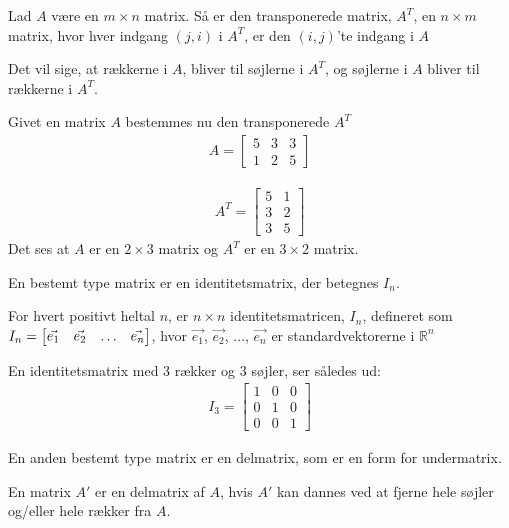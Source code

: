 \begin{defn}
Lad $A$ være en $m \times n$ matrix. Så er den transponerede matrix, $A^T$, en $n \times m$ matrix, hvor hver indgang $(j,i)$ i $A^T$, er den $(i,j)$'te indgang i $A$
\label{def:(transmatrix)} 
\end{defn}
Det vil sige, at rækkerne i $A$, bliver til søjlerne i $A^T$, og søjlerne i $A$ bliver til rækkerne i $A^T$.

\begin{eks}
Givet en matrix $A$ bestemmes nu den transponerede $A^T$
\begin{align*}
A = \begin{bmatrix}
	5 & 3 & 3 \\
	1 & 2 & 5
\end{bmatrix}
\end{align*}

\begin{align*}
A^T = \begin{bmatrix}
	5 & 1  \\
	3 & 2  \\
	3 & 5
\end{bmatrix}
\end{align*}
Det ses at $A$ er en $2 \times 3$ matrix og $A^T$ er en $3 \times 2$ matrix. 
\end{eks}


En bestemt type matrix er en identitetsmatrix, der betegnes $I_n$. 

\begin{defn} [Identitetsmatrix]
For hvert positivt heltal $n$, er $n \times n$ identitetsmatricen, $I_n$, defineret som\\ $I_n = \begin{bmatrix} \vec{e_1} & \vec{e_2} & \dots &  \vec{e_n} \end{bmatrix}$, hvor $\vec{e_1}$, $\vec{e_2}$, $\dots$, $\vec{e_n}$ er standardvektorerne i $\mathds{R}^n$
\label{def:imatrix}
\end{defn}

En identitetsmatrix med $3$ rækker og $3$ søjler, ser således ud:
\begin{align*}
I_3 = \begin{bmatrix}
	1 & 0 & 0 \\
	0 & 1 & 0 \\
	0 & 0 & 1 
\end{bmatrix}
\end{align*}

En anden bestemt type matrix er en delmatrix, som er en form for undermatrix. 
\begin{defn} [Delmatrix]
En matrix $A'$ er en delmatrix af $A$, hvis $A'$ kan dannes ved at fjerne hele søjler og/eller hele rækker fra $A$.
\label{delmatrix}
\end{defn}

